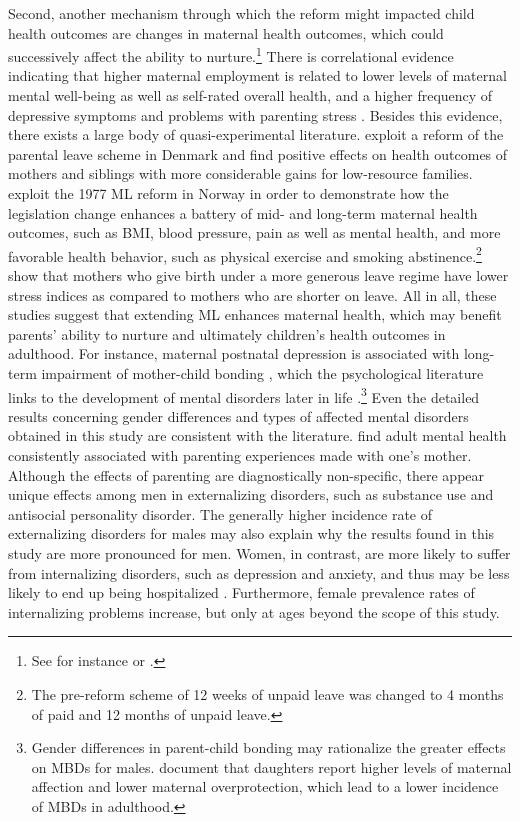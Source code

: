 Second, another mechanism through which the reform might impacted child health outcomes are changes in maternal health outcomes, which could successively affect the ability to nurture.\footnote{See for instance \cite{patel2004} or \cite{frech2011maternal}.} There is correlational evidence indicating that higher maternal employment is related to lower levels of maternal mental well-being as well as self-rated overall health, and a higher frequency of depressive symptoms and problems with parenting stress \citep{chatterji2005does,Chatterji2013}. Besides this evidence, there exists a large body of quasi-experimental literature. \cite{beuchert2016} exploit a reform of the parental leave scheme in Denmark and find positive effects on health outcomes of mothers and siblings with more considerable gains for low-resource families. \cite{butikofer2018impact} exploit the 1977 ML reform in Norway in order to demonstrate how the legislation change enhances a battery of mid- and long-term maternal health outcomes, such as BMI, blood pressure, pain as well as mental health, and more favorable health behavior, such as physical exercise and smoking abstinence.\footnote{The pre-reform scheme of 12 weeks of unpaid leave was changed to 4 months of paid and 12 months of unpaid leave.} \cite{albagli2018} show that mothers who give birth under a more generous leave regime have lower stress indices as compared to mothers who are shorter on leave. All in all, these studies suggest that extending ML enhances maternal health, which may benefit parents' ability to nurture and ultimately children's health outcomes in adulthood. For instance, maternal postnatal depression is associated with long-term impairment of mother-child bonding \citep{tronick2009}, which the psychological literature links to the development of mental disorders later in life \citep{canetti1997parental}.\footnote{Gender differences in parent-child bonding may rationalize the greater effects on MBDs for males. \cite{murphy2010} document that daughters report higher levels of maternal affection and lower maternal overprotection, which lead to a lower incidence of MBDs in adulthood.} Even the detailed results concerning gender differences and types of affected mental disorders obtained in this study are consistent with the literature. \cite{enns_cox_clara_2002} find adult mental health consistently associated with parenting experiences made with one's mother. Although the effects of parenting are diagnostically non-specific, there appear unique effects among men in externalizing disorders, such as substance use and antisocial personality disorder. The generally higher incidence rate of externalizing disorders for males may also explain why the results found in this study are more pronounced for men. Women, in contrast, are more likely to suffer from internalizing disorders, such as depression and anxiety, and thus may be less likely to end up being hospitalized \citep{statistisches2012diagnosedaten}. Furthermore, female prevalence rates of internalizing problems increase, but only at ages beyond the scope of this study.


